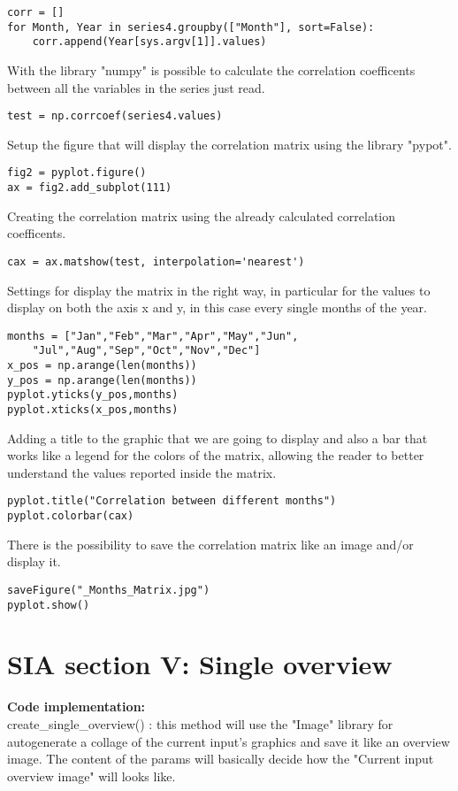 \begin{lstlisting}
corr = []
for Month, Year in series4.groupby(["Month"], sort=False):
	corr.append(Year[sys.argv[1]].values)
\end{lstlisting}
	
With the library "numpy" is possible to calculate the correlation coefficents between all the variables in the series just read.
\begin{lstlisting}
test = np.corrcoef(series4.values)
\end{lstlisting}

Setup the figure that will display the correlation matrix using the library "pypot".
\begin{lstlisting}
fig2 = pyplot.figure()
ax = fig2.add_subplot(111)
\end{lstlisting}

Creating the correlation matrix using the already calculated correlation coefficents.
\begin{lstlisting}
cax = ax.matshow(test, interpolation='nearest')
\end{lstlisting}

Settings for display the matrix in the right way, in particular for the values to display on both the axis x and y, in this case every single months of the year.
\begin{lstlisting}
months = ["Jan","Feb","Mar","Apr","May","Jun",
	"Jul","Aug","Sep","Oct","Nov","Dec"]
x_pos = np.arange(len(months))
y_pos = np.arange(len(months))
pyplot.yticks(y_pos,months)
pyplot.xticks(x_pos,months)
\end{lstlisting}
Adding a title to the graphic that we are going to display and also a bar that works like a legend for the colors of the matrix, allowing the reader to better understand the values reported inside the matrix.
\begin{lstlisting}
pyplot.title("Correlation between different months")
pyplot.colorbar(cax)
\end{lstlisting}

There is the possibility to save the correlation matrix like an image and/or display it.
\begin{lstlisting}
saveFigure("_Months_Matrix.jpg")
pyplot.show()
\end{lstlisting}

\section{SIA section V: Single overview}
\label{SIA_section_V}
\textbf{Code implementation:}\\
create\_single\_overview() : this method will use the "Image" library for autogenerate a collage of the current input's graphics and save it like an overview image. The content of the params will basically decide how the "Current input overview image" will looks like.

